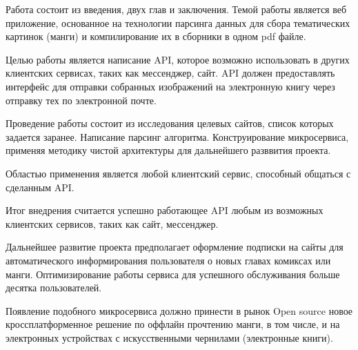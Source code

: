 \abstract %


Работа состоит из введения, двух глав и заключения. 
Темой работы является веб приложение, основанное на технологии парсинга данных для сбора тематических картинок (манги) и компилирование их в сборники в одном pdf файле.

Целью работы является написание API, которое возможно использовать в других клиентских сервисах, таких как мессенджер, сайт.
API должен предоставлять интерфейс для отправки собранных изображений на электронную книгу через отправку тех по электронной почте.

Проведение работы состоит из исследования целевых сайтов, список которых задается заранее. 
Написание парсинг алгоритма. Конструирование микросервиса, применяя методику чистой архитектуры для дальнейшего разввития проекта.

Областью применения является любой клиентский сервис, способный общаться с сделанным API.

Итог внедрения считается успешно работающее API любым из возможных клиентских сервисов, таких как сайт, мессенджер.

Дальнейшее развитие проекта предполагает оформление подписки на сайты для автоматического информирования пользователя о новых главах комиксах или манги.
Оптимизирование работы сервиса для успешного обслуживания больше десятка пользователей.

Появление подобного микросервиса должно принести в рынок Open source новое кроссплатформенное решение по оффлайн прочтению манги, в том числе, и на электронных устройствах с искусственными чернилами (электронные книги).